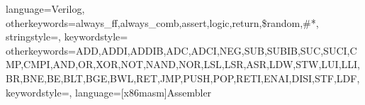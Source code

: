  {
  language=Verilog,
  otherkeywords={always\_ff,always\_comb,assert,logic,return,\$random,\#*},            %
  stringstyle=\color{mymauve},     %
  keywordstyle=\color{blue}      %
}
 {
  otherkeywords={ADD,ADDI,ADDIB,ADC,ADCI,NEG,SUB,SUBIB,SUC,SUCI,CMP,CMPI,AND,OR,XOR,NOT,NAND,NOR,LSL,LSR,ASR,LDW,STW,LUI,LLI,BR,BNE,BE,BLT,BGE,BWL,RET,JMP,PUSH,POP,RETI,ENAI,DISI,STF,LDF},            %
  keywordstyle=\color{blue},       %
  language={[x86masm]Assembler}                %
}


